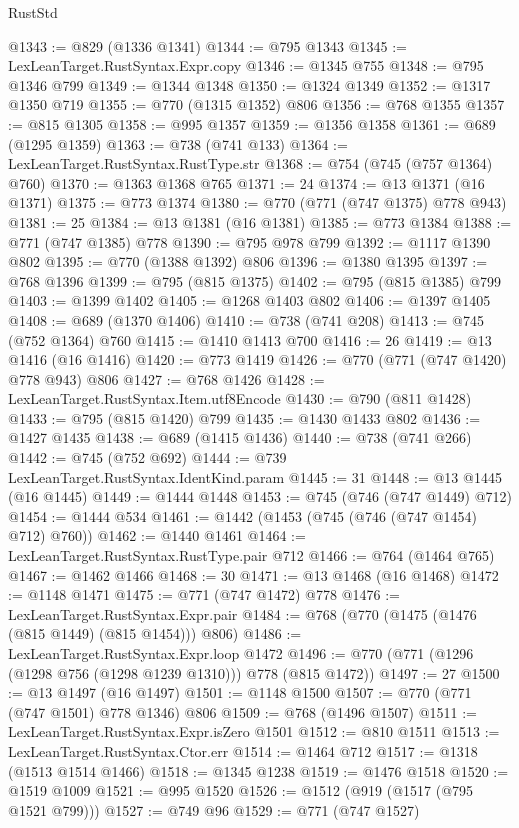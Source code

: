 \begin{lexlean}{RustStd}
\begin{coremodule}
@1343 := @829 (@1336 @1341)
@1344 := @795 @1343
@1345 := LexLeanTarget.RustSyntax.Expr.copy
@1346 := @1345 @755
@1348 := @795 @1346 @799
@1349 := @1344 @1348
@1350 := @1324 @1349
@1352 := @1317 @1350 @719
@1355 := @770 (@1315 @1352) @806
@1356 := @768 @1355
@1357 := @815 @1305
@1358 := @995 @1357
@1359 := @1356 @1358
@1361 := @689 (@1295 @1359)
@1363 := @738 (@741 @133)
@1364 := LexLeanTarget.RustSyntax.RustType.str
@1368 := @754 (@745 (@757 @1364) @760)
@1370 := @1363 @1368 @765
@1371 := 24
@1374 := @13 @1371 (@16 @1371)
@1375 := @773 @1374
@1380 := @770 (@771 (@747 @1375) @778 @943)
@1381 := 25
@1384 := @13 @1381 (@16 @1381)
@1385 := @773 @1384
@1388 := @771 (@747 @1385) @778
@1390 := @795 @978 @799
@1392 := @1117 @1390 @802
@1395 := @770 (@1388 @1392) @806
@1396 := @1380 @1395
@1397 := @768 @1396
@1399 := @795 (@815 @1375)
@1402 := @795 (@815 @1385) @799
@1403 := @1399 @1402
@1405 := @1268 @1403 @802
@1406 := @1397 @1405
@1408 := @689 (@1370 @1406)
@1410 := @738 (@741 @208)
@1413 := @745 (@752 @1364) @760
@1415 := @1410 @1413 @700
@1416 := 26
@1419 := @13 @1416 (@16 @1416)
@1420 := @773 @1419
@1426 := @770 (@771 (@747 @1420) @778 @943) @806
@1427 := @768 @1426
@1428 := LexLeanTarget.RustSyntax.Item.utf8Encode
@1430 := @790 (@811 @1428)
@1433 := @795 (@815 @1420) @799
@1435 := @1430 @1433 @802
@1436 := @1427 @1435
@1438 := @689 (@1415 @1436)
@1440 := @738 (@741 @266)
@1442 := @745 (@752 @692)
@1444 := @739 LexLeanTarget.RustSyntax.IdentKind.param
@1445 := 31
@1448 := @13 @1445 (@16 @1445)
@1449 := @1444 @1448
@1453 := @745 (@746 (@747 @1449) @712)
@1454 := @1444 @534
@1461 := @1442 (@1453 (@745 (@746 (@747 @1454) @712) @760))
@1462 := @1440 @1461
@1464 := LexLeanTarget.RustSyntax.RustType.pair @712
@1466 := @764 (@1464 @765)
@1467 := @1462 @1466
@1468 := 30
@1471 := @13 @1468 (@16 @1468)
@1472 := @1148 @1471
@1475 := @771 (@747 @1472) @778
@1476 := LexLeanTarget.RustSyntax.Expr.pair
@1484 := @768 (@770 (@1475 (@1476 (@815 @1449) (@815 @1454))) @806)
@1486 := LexLeanTarget.RustSyntax.Expr.loop @1472
@1496 := @770 (@771 (@1296 (@1298 @756 (@1298 @1239 @1310))) @778 (@815 @1472))
@1497 := 27
@1500 := @13 @1497 (@16 @1497)
@1501 := @1148 @1500
@1507 := @770 (@771 (@747 @1501) @778 @1346) @806
@1509 := @768 (@1496 @1507)
@1511 := LexLeanTarget.RustSyntax.Expr.isZero @1501
@1512 := @810 @1511
@1513 := LexLeanTarget.RustSyntax.Ctor.err
@1514 := @1464 @712
@1517 := @1318 (@1513 @1514 @1466)
@1518 := @1345 @1238
@1519 := @1476 @1518
@1520 := @1519 @1009
@1521 := @995 @1520
@1526 := @1512 (@919 (@1517 (@795 @1521 @799)))
@1527 := @749 @96
@1529 := @771 (@747 @1527)

\end{coremodule}
\end{lexlean}
